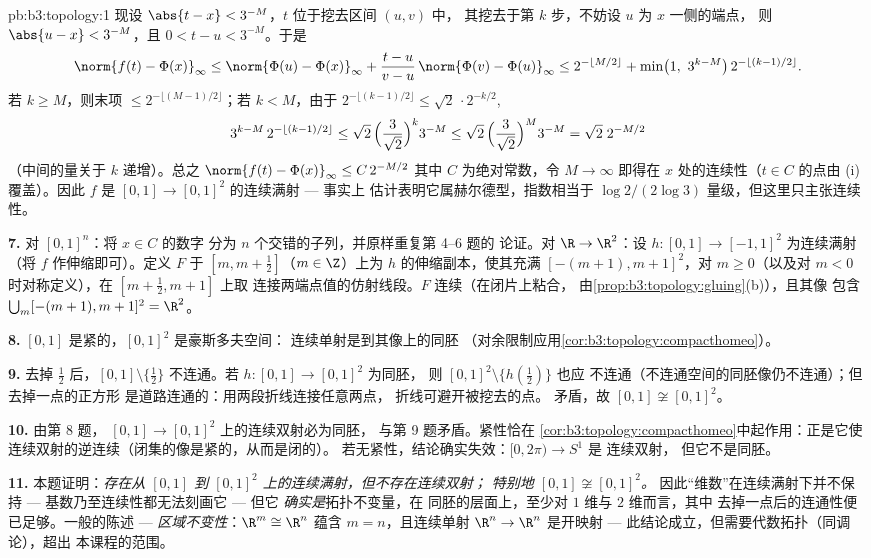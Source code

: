 \begin{solution}{pb:b3:topology:1}
现设 $\abs{t - x} < 3^{-M}$，$t$ 位于挖去区间 $(u, v)$ 中，
其挖去于第 $k$ 步，不妨设 $u$ 为 $x$ 一侧的端点，
则 $\abs{u - x} < 3^{-M}$，且 $0 < t - u < 3^{-M}$。于是
\[
\norm{f(t) - \Phi(x)}_\infty
\leq \norm{\Phi(u) - \Phi(x)}_\infty
+ \frac{t - u}{v - u}\,\norm{\Phi(v) - \Phi(u)}_\infty
\leq 2^{-\lfloor M/2\rfloor} + \min\bigl(1,\ 3^{k - M}\bigr)\,
2^{-\lfloor(k-1)/2\rfloor} .
\]
若 $k \geq M$，则末项 $\leq 2^{-\lfloor(M-1)/2
\rfloor}$；若 $k < M$，由于 $2^{-\lfloor(k-1)/2\rfloor} \leq
\sqrt2\,\cdot 2^{-k/2}$,
\[
3^{k-M}\,2^{-\lfloor(k-1)/2\rfloor}
\leq \sqrt2\,\Bigl(\frac{3}{\sqrt2}\Bigr)^{k} 3^{-M}
\leq \sqrt2\,\Bigl(\frac{3}{\sqrt2}\Bigr)^{M} 3^{-M}
= \sqrt2\; 2^{-M/2}
\]
（中间的量关于 $k$ 递增）。总之
$\norm{f(t) - \Phi(x)}_\infty \leq C\,2^{-M/2}$
其中 $C$ 为绝对常数，令 $M \to \infty$
即得在 $x$ 处的连续性（$t \in C$ 的点由 (i) 覆盖）。因此
$f$ 是 $[0,1] \to [0,1]^2$ 的连续满射 --- 事实上
估计表明它属赫尔德型，指数相当于 $\log 2/(2\log
3)$ 量级，但这里只主张连续性。

\textbf{7.} 对 $[0,1]^n$：将 $x \in C$ 的数字
分为 $n$ 个交错的子列，并原样重复第 4--6 题的
论证。对 $\R \to \R^2$：设 $h \colon [0,1] \to [-1,1]^2$
为连续满射（将 $f$ 作伸缩即可）。定义 $F$ 于 $[m, m
+ \frac12]$（$m \in \Z$）上为 $h$ 的伸缩副本，使其充满
$[-(m+1), m+1]^2$，对 $m \geq 0$（以及对 $m <
0$ 时对称定义），在 $[m + \frac12, m + 1]$ 上取
连接两端点值的仿射线段。$F$ 连续（在闭片上粘合，
由\cref{prop:b3:topology:gluing}(b)），且其像
包含 $\bigcup_m [-(m+1), m+1]^2 = \R^2$。

\textbf{8.} $[0,1]$ 是紧的，$[0,1]^2$ 是豪斯多夫空间：
连续单射是到其像上的同胚
（对余限制应用\cref{cor:b3:topology:compacthomeo}）。

\textbf{9.} 去掉 $\frac12$ 后，$[0,1]\setminus\{\frac12\}$
不连通。若 $h \colon [0,1] \to [0,1]^2$ 为同胚，
则 $[0,1]^2\setminus\{h(\frac12)\}$ 也应
不连通（不连通空间的同胚像仍不连通）；但去掉一点的正方形
是道路连通的：用两段折线连接任意两点，
折线可避开被挖去的点。
矛盾，故 $[0,1] \not\cong [0,1]^2$。

\textbf{10.} 由第 8 题，
$[0,1] \to [0,1]^2$ 上的连续双射必为同胚，
与第 9 题矛盾。紧性恰在
\cref{cor:b3:topology:compacthomeo}中起作用：正是它使
连续双射的逆连续（闭集的像是紧的，从而是闭的）。
若无紧性，结论确实失效：$[0, 2\pi) \to S^1$ 是
连续双射，
但它不是同胚。

\textbf{11.} 本题证明：\emph{存在从 $[0,1]$ 到
$[0,1]^2$ 上的连续满射，但不存在连续双射；
特别地 $[0,1] \not\cong [0,1]^2$。}
因此“维数”在连续满射下并不保持 ---
基数乃至连续性都无法刻画它 --- 但它
\emph{确实是}拓扑不变量，在
同胚的层面上，至少对 $1$ 维与 $2$ 维而言，其中
去掉一点后的连通性便已足够。一般的陈述
--- \emph{区域不变性}：$\R^m \cong \R^n$ 蕴含 $m =
n$，且连续单射 $\R^n \to \R^n$ 是开映射 ---
此结论成立，但需要代数拓扑（同调论），超出
本课程的范围。


\end{solution}
